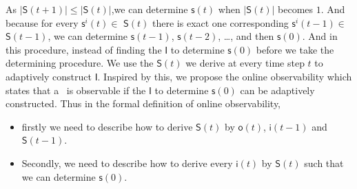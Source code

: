 As $|\mathsf{S}(t+1)|\le|\mathsf{S}(t)|$,we can determine $\mathsf{s}(t)$  when $|\mathsf{S}(t)|$ becomes $1$. And because for every $\mathsf{s}^{i}(t)\in $ $\mathsf{S}(t)$ there is exact one corresponding $\mathsf{s}^{i}(t-1)\in $ $\mathsf{S}(t-1)$, we can determine $\mathsf{s}(t-1)$, $\mathsf{s}(t-2)$, \ldots, and then $\mathsf{s}(0)$.
And in this procedure, instead of finding the  $\mathsf{I}$ to determine $\mathsf{s}(0)$ before we take the determining procedure. We use the $\mathsf{S}(t)$ we derive at every time step $t$ to adaptively construct $\mathsf{I}$. Inspired by this, we propose the online observability which states that a \BCN\ is observable if the $\mathsf{I}$ to determine $\mathsf{s}(0)$ can be adaptively constructed. 
Thus in the formal definition of online observability, 
\begin{itemize}
\item firstly we need to describe how to derive $\mathsf{S}(t)$ by $\mathsf{o}(t)$, $\mathsf{i}(t-1)$ and $\mathsf{S}(t-1)$. %
\item  Secondly, we need to describe how to derive every $\mathsf{i}(t)$ by $\mathsf{S}(t)$ such that  we can determine $\mathsf{s}(0)$. %
\end{itemize} 



